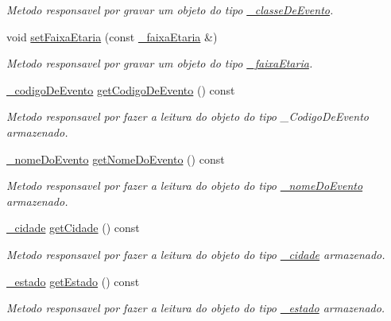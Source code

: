 \begin{DoxyCompactItemize}
\begin{DoxyCompactList}\small\item\em Metodo responsavel por gravar um objeto do tipo \mbox{\hyperlink{class__classe_de_evento}{\+\_\+classe\+De\+Evento}}. \end{DoxyCompactList}\item 
void \mbox{\hyperlink{class__evento_a708adeef6900a5fea7700d23c86890d8}{set\+Faixa\+Etaria}} (const \mbox{\hyperlink{class__faixa_etaria}{\+\_\+faixa\+Etaria}} \&)
\begin{DoxyCompactList}\small\item\em Metodo responsavel por gravar um objeto do tipo \mbox{\hyperlink{class__faixa_etaria}{\+\_\+faixa\+Etaria}}. \end{DoxyCompactList}\item 
\mbox{\hyperlink{class__codigo_de_evento}{\+\_\+codigo\+De\+Evento}} \mbox{\hyperlink{class__evento_af23e6eb402415c8b4661c0508c6de175}{get\+Codigo\+De\+Evento}} () const
\begin{DoxyCompactList}\small\item\em Metodo responsavel por fazer a leitura do objeto do tipo \+\_\+\+Codigo\+De\+Evento armazenado. \end{DoxyCompactList}\item 
\mbox{\hyperlink{class__nome_do_evento}{\+\_\+nome\+Do\+Evento}} \mbox{\hyperlink{class__evento_a039cedaa58c39d2d414337b802f7a03c}{get\+Nome\+Do\+Evento}} () const
\begin{DoxyCompactList}\small\item\em Metodo responsavel por fazer a leitura do objeto do tipo \mbox{\hyperlink{class__nome_do_evento}{\+\_\+nome\+Do\+Evento}} armazenado. \end{DoxyCompactList}\item 
\mbox{\hyperlink{class__cidade}{\+\_\+cidade}} \mbox{\hyperlink{class__evento_a364e71fdeb3267c9fb32b1964b9168e3}{get\+Cidade}} () const
\begin{DoxyCompactList}\small\item\em Metodo responsavel por fazer a leitura do objeto do tipo \mbox{\hyperlink{class__cidade}{\+\_\+cidade}} armazenado. \end{DoxyCompactList}\item 
\mbox{\hyperlink{class__estado}{\+\_\+estado}} \mbox{\hyperlink{class__evento_a786626712151d8e0aae854b73c6d195c}{get\+Estado}} () const
\begin{DoxyCompactList}\small\item\em Metodo responsavel por fazer a leitura do objeto do tipo \mbox{\hyperlink{class__estado}{\+\_\+estado}} armazenado. \end{DoxyCompactList}\item 

\end{DoxyCompactItemize}
